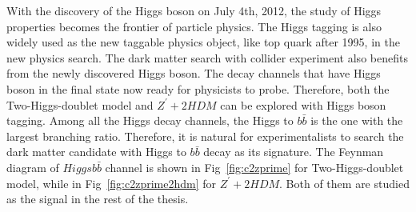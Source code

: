 \par With the discovery of the Higgs boson\cite{Aad:2012tfa}\cite{Chatrchyan:2012xdj} on July 4th, 2012, the study of Higgs properties becomes the frontier of particle physics. The Higgs tagging is also widely used as the new taggable physics object, like top quark after 1995, in the new physics search. The dark matter search with collider experiment also benefits from the newly discovered Higgs boson. The decay channels that have Higgs boson in the final state now ready for physicists to probe. Therefore, both the Two-Higgs-doublet model and $Z^{\prime}+2HDM$ can be explored with Higgs boson tagging. Among all the Higgs decay channels, the Higgs to $b\bar{b}$ is the one with the largest branching ratio. Therefore, it is natural for experimentalists to search the dark matter candidate with Higgs to $b\bar{b}$ decay as its signature. The Feynman diagram of $Higgs b\bar{b}$ channel is shown in Fig~\ref{fig:c2zprime} for Two-Higgs-doublet model, while in Fig~\ref{fig:c2zprime2hdm} for $Z^{\prime}+2HDM$. Both of them are studied as the signal in the rest of the thesis.
